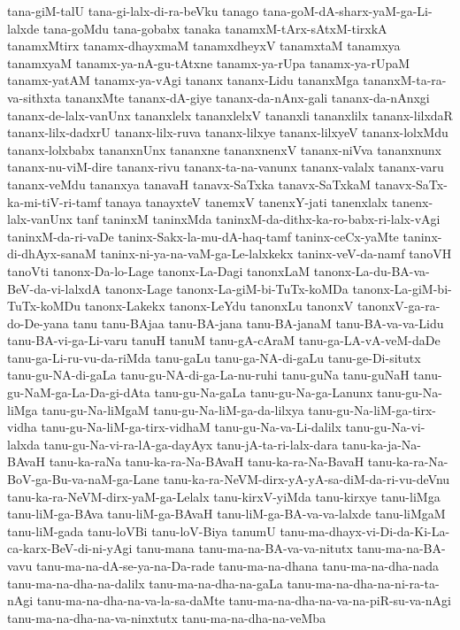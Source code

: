 {tana-giM-talU
tana-gi-lalx-di-ra-beVku
tanago
tana-goM-dA-sharx-yaM-ga-Li-lalxde
tana-goMdu
tana-gobabx
tanaka
tanamxM-tArx-sAtxM-tirxkA
tanamxMtirx
tanamx-dhayxmaM
tanamxdheyxV
tanamxtaM
tanamxya
tanamxyaM
tanamx-ya-nA-gu-tAtxne
tanamx-ya-rUpa
tanamx-ya-rUpaM
tanamx-yatAM
tanamx-ya-vAgi
tananx
tananx-Lidu
tananxMga
tananxM-ta-ra-va-sithxta
tananxMte
tananx-dA-giye
tananx-da-nAnx-gali
tananx-da-nAnxgi
tananx-de-lalx-vanUnx
tananxlelx
tananxlelxV
tananxli
tananxlilx
tananx-lilxdaR
tananx-lilx-dadxrU
tananx-lilx-ruva
tananx-lilxye
tananx-lilxyeV
tananx-lolxMdu
tananx-lolxbabx
tananxnUnx
tananxne
tananxnenxV
tananx-niVva
tananxnunx
tananx-nu-viM-dire
tananx-rivu
tananx-ta-na-vanunx
tananx-valalx
tananx-varu
tananx-veMdu
tananxya
tanavaH
tanavx-SaTxka
tanavx-SaTxkaM
tanavx-SaTx-ka-mi-tiV-ri-tamf
tanaya
tanayxteV
tanemxV
tanenxY-jati
tanenxlalx
tanenx-lalx-vanUnx
tanf
taninxM
taninxMda
taninxM-da-dithx-ka-ro-babx-ri-lalx-vAgi
taninxM-da-ri-vaDe
taninx-Sakx-la-mu-dA-haq-tamf
taninx-ceCx-yaMte
taninx-di-dhAyx-sanaM
taninx-ni-ya-na-vaM-ga-Le-lalxkekx
taninx-veV-da-namf
tanoVH
tanoVti
tanonx-Da-lo-Lage
tanonx-La-Dagi
tanonxLaM
tanonx-La-du-BA-va-BeV-da-vi-lalxdA
tanonx-Lage
tanonx-La-giM-bi-TuTx-koMDa
tanonx-La-giM-bi-TuTx-koMDu
tanonx-Lakekx
tanonx-LeYdu
tanonxLu
tanonxV
tanonxV-ga-ra-do-De-yana
tanu
tanu-BAjaa
tanu-BA-jana
tanu-BA-janaM
tanu-BA-va-va-Lidu
tanu-BA-vi-ga-Li-varu
tanuH
tanuM
tanu-gA-cAraM
tanu-ga-LA-vA-veM-daDe
tanu-ga-Li-ru-vu-da-riMda
tanu-gaLu
tanu-ga-NA-di-gaLu
tanu-ge-Di-situtx
tanu-gu-NA-di-gaLa
tanu-gu-NA-di-ga-La-nu-ruhi
tanu-guNa
tanu-guNaH
tanu-gu-NaM-ga-La-Da-gi-dAta
tanu-gu-Na-gaLa
tanu-gu-Na-ga-Lanunx
tanu-gu-Na-liMga
tanu-gu-Na-liMgaM
tanu-gu-Na-liM-ga-da-lilxya
tanu-gu-Na-liM-ga-tirx-vidha
tanu-gu-Na-liM-ga-tirx-vidhaM
tanu-gu-Na-va-Li-dalilx
tanu-gu-Na-vi-lalxda
tanu-gu-Na-vi-ra-lA-ga-dayAyx
tanu-jA-ta-ri-lalx-dara
tanu-ka-ja-Na-BAvaH
tanu-ka-raNa
tanu-ka-ra-Na-BAvaH
tanu-ka-ra-Na-BavaH
tanu-ka-ra-Na-BoV-ga-Bu-va-naM-ga-Lane
tanu-ka-ra-NeVM-dirx-yA-yA-sa-diM-da-ri-vu-deVnu
tanu-ka-ra-NeVM-dirx-yaM-ga-Lelalx
tanu-kirxV-yiMda
tanu-kirxye
tanu-liMga
tanu-liM-ga-BAva
tanu-liM-ga-BAvaH
tanu-liM-ga-BA-va-va-lalxde
tanu-liMgaM
tanu-liM-gada
tanu-loVBi
tanu-loV-Biya
tanumU
tanu-ma-dhayx-vi-Di-da-Ki-La-ca-karx-BeV-di-ni-yAgi
tanu-mana
tanu-ma-na-BA-va-va-nitutx
tanu-ma-na-BA-vavu
tanu-ma-na-dA-se-ya-na-Da-rade
tanu-ma-na-dhana
tanu-ma-na-dha-nada
tanu-ma-na-dha-na-dalilx
tanu-ma-na-dha-na-gaLa
tanu-ma-na-dha-na-ni-ra-ta-nAgi
tanu-ma-na-dha-na-va-la-sa-daMte
tanu-ma-na-dha-na-va-na-piR-su-va-nAgi
tanu-ma-na-dha-na-va-ninxtutx
tanu-ma-na-dha-na-veMba
}

